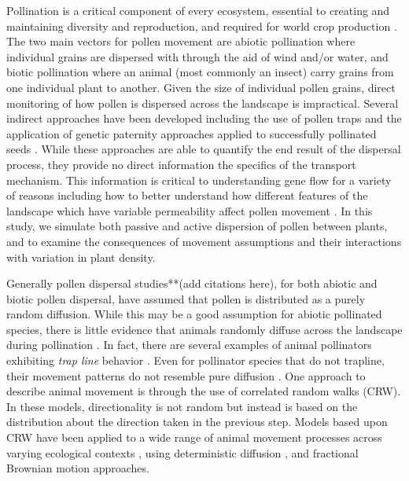 Pollination is a critical component of every ecosystem, essential to creating and maintaining
diversity and reproduction, and required for world crop production \cite{KleinEtAl2007}.
The two main vectors for pollen movement are abiotic pollination where individual grains are
dispersed with through the aid of wind and/or water, and biotic pollination where an animal (most
commonly an insect) carry grains from one individual plant to another.  Given the size of individual pollen grains, direct monitoring of how pollen
is dispersed across the landscape is impractical.  Several indirect approaches have been developed
including the use of pollen traps and the application of genetic paternity approaches applied to
successfully pollinated seeds \cite{BitzerPatterson1967,StreiffEtAl1999}.  While these
approaches are able to quantify the end result of the dispersal process, they provide no direct information
the specifics of the transport mechanism.  This information is critical to understanding gene flow for a variety of reasons including
how to better understand how different features of
the landscape which have variable permeability affect pollen movement \cite{DyerSork2001,DyerEtAl2012}. In
this study, we simulate both passive and active dispersion of pollen between plants, and to examine the consequences of movement assumptions and their interactions
with variation in plant density.

Generally pollen dispersal studies**(add citations here), for both abiotic and biotic pollen dispersal, have assumed that pollen is distributed as a purely random diffusion.  While this may be a good assumption for abiotic
pollinated species, there is little evidence that animals randomly diffuse across the landscape
during pollination \cite{LevinKerster}.  In fact, there are several examples of animal pollinators
exhibiting \emph{trap line} behavior \cite[e.g., repeated sequential visits to individual
plants]{OhashiThomson}. Even for pollinator species that do not trapline, their movement patterns
do not resemble pure diffusion \cite{Cresswell03}. One approach to describe animal
movement is through the use of correlated random walks (CRW).  In these models, directionality is
not random but instead is based on the distribution about the direction taken
in the previous step.  Models based upon CRW have been applied to a wide range of animal
movement processes across varying ecological contexts \cite{Bartumeus07,Byers01}, using
deterministic diffusion \cite{Klages}, and fractional Brownian motion \cite{Enriquez} approaches.

